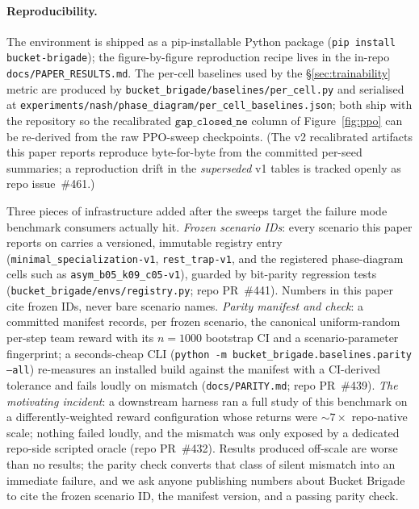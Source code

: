\documentclass{anvil-paper}
\begin{document}
\paragraph{Reproducibility.}
The environment is shipped as a pip-installable Python package
(\texttt{pip install bucket-brigade}); the figure-by-figure reproduction
recipe lives in the in-repo \texttt{docs/PAPER\_RESULTS.md}. The per-cell
baselines used by the \S\ref{sec:trainability} metric are produced by
\texttt{bucket\_brigade/baselines/per\_cell.py} and serialised at
\texttt{experiments/nash/phase\_diagram/per\_cell\_baselines.json}; both
ship with the repository so the recalibrated $\texttt{gap\_closed\_ne}$
column of Figure~\ref{fig:ppo} can be re-derived from the raw PPO-sweep
checkpoints. (The v2 recalibrated artifacts this paper reports
reproduce byte-for-byte from the committed per-seed summaries; a
reproduction drift in the \emph{superseded} v1 tables is tracked openly
as repo issue~\#461.)

Three pieces of infrastructure added after the sweeps target the failure
mode benchmark consumers actually hit. \emph{Frozen scenario IDs}: every
scenario this paper reports on carries a versioned, immutable registry
entry (\texttt{minimal\_specialization-v1}, \texttt{rest\_trap-v1}, and
the registered phase-diagram cells such as
\texttt{asym\_b05\_k09\_c05-v1}), guarded by bit-parity regression tests
(\texttt{bucket\_brigade/envs/registry.py}; repo PR~\#441). Numbers in
this paper cite frozen IDs, never bare scenario names. \emph{Parity
manifest and check}: a committed manifest records, per frozen scenario,
the canonical uniform-random per-step team reward with its $n{=}1000$
bootstrap CI and a scenario-parameter fingerprint; a seconds-cheap CLI
(\texttt{python -m bucket\_brigade.baselines.parity --all}) re-measures
an installed build against the manifest with a CI-derived tolerance and
fails loudly on mismatch (\texttt{docs/PARITY.md}; repo PR~\#439).
\emph{The motivating incident}: a downstream harness ran a full study of
this benchmark on a differently-weighted reward configuration whose
returns were ${\sim}7{\times}$ repo-native scale; nothing failed loudly,
and the mismatch was only exposed by a dedicated repo-side scripted
oracle (repo PR~\#432). Results produced off-scale are worse than no
results; the parity check converts that class of silent mismatch into an
immediate failure, and we ask anyone publishing numbers about Bucket
Brigade to cite the frozen scenario ID, the manifest version, and a
passing parity check.
\end{document}
